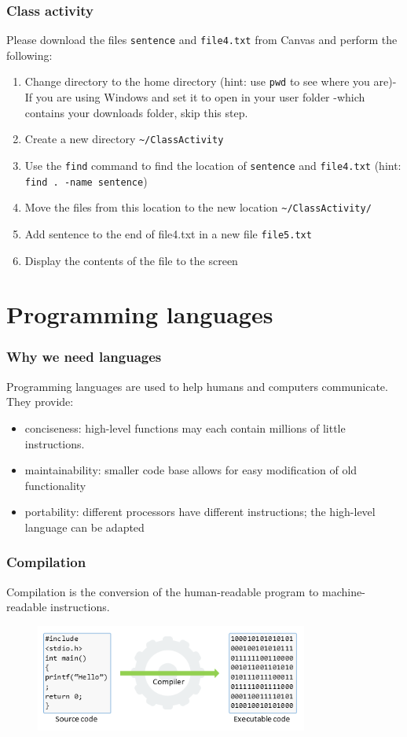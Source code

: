 \documentclass{if-beamer}
\begin{document}
\begin{frame}
\frametitle{Class activity}
\vspace{1.5cm}
Please download the files \texttt{sentence} and \texttt{file4.txt} from Canvas and perform the following:
\begin{enumerate}
\item Change directory to the home directory (hint: use \texttt{pwd}
to see where you are)- If you are using Windows and set it to open in your user folder -which contains your downloads folder, skip this step.
\item Create a new directory \texttt{\textasciitilde/ClassActivity}
\item Use the \texttt{find} command to find the location of
\texttt{sentence} and \texttt{file4.txt} (hint: \texttt{find . -name sentence})
\item Move the files from this location to the new location
\texttt{\textasciitilde/ClassActivity/}
\item Add sentence to the end of file4.txt in a new file \texttt{file5.txt}
\item Display the contents of the file to the screen
\end{enumerate}
\end{frame}

\section{Programming languages}

\begin{frame}
\frametitle{Why we need languages}
Programming languages are used to help humans and computers
communicate. They provide:
\begin{itemize}
	\item conciseness: high-level functions may each contain
	millions of little instructions.
	\item maintainability: smaller code base allows for easy
	modification of old functionality
	\item portability: different processors have different instructions;
	the high-level language can be adapted
\end{itemize}
\end{frame}

\begin{frame}
\frametitle{Compilation}
Compilation is the conversion of the human-readable program to machine-readable instructions. \\[0.5cm]
\begin{figure}
\center
\includegraphics[width=0.8\textwidth]{compilation.png}
\end{figure}
\end{frame}
\end{document}
